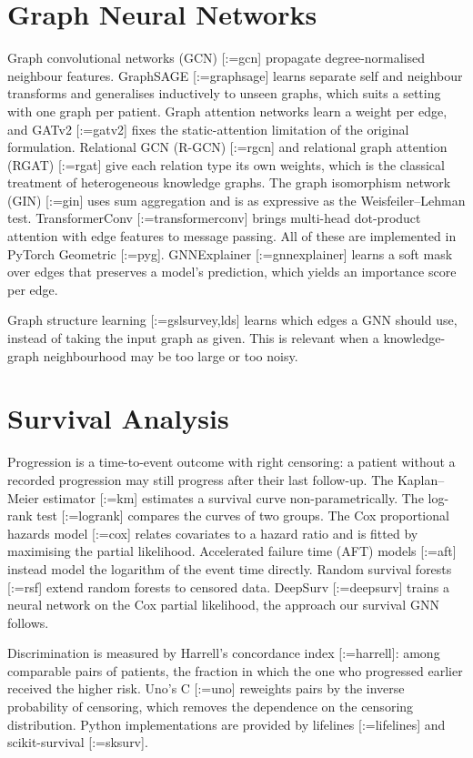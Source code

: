 \documentclass{mnnit}
\makeatletter
\newcommand{\rc}[1]{[\def\rc@sep{}\@for\rc@key:=#1\do{\rc@sep\ref{ref:\rc@key}\def\rc@sep{, }}]}
\makeatother
\begin{document}
\section{Graph Neural Networks}
Graph convolutional networks (GCN) \rc{gcn} propagate degree-normalised neighbour features. GraphSAGE \rc{graphsage}
learns separate self and neighbour transforms and generalises inductively to unseen graphs, which suits a setting
with one graph per patient. Graph attention networks learn a weight per edge, and GATv2 \rc{gatv2} fixes the
static-attention limitation of the original formulation. Relational GCN (R-GCN) \rc{rgcn} and relational graph
attention (RGAT) \rc{rgat} give each relation type its own weights, which is the classical treatment of
heterogeneous knowledge graphs. The graph isomorphism network (GIN) \rc{gin} uses sum aggregation and is as
expressive as the Weisfeiler--Lehman test. TransformerConv \rc{transformerconv} brings multi-head dot-product
attention with edge features to message passing. All of these are implemented in PyTorch Geometric \rc{pyg}.
GNNExplainer \rc{gnnexplainer} learns a soft mask over edges that preserves a model's prediction, which yields an
importance score per edge.

Graph structure learning \rc{gslsurvey,lds} learns which edges a GNN should use, instead of taking the input
graph as given. This is relevant when a knowledge-graph neighbourhood may be too large or too noisy.

\section{Survival Analysis}
Progression is a time-to-event outcome with right censoring: a patient without a recorded progression may still
progress after their last follow-up. The Kaplan--Meier estimator \rc{km} estimates a survival curve non-parametrically.
The log-rank test \rc{logrank} compares the curves of two groups. The Cox proportional hazards model \rc{cox}
relates covariates to a hazard ratio and is fitted by maximising the partial likelihood. Accelerated failure time
(AFT) models \rc{aft} instead model the logarithm of the event time directly. Random survival forests \rc{rsf}
extend random forests to censored data. DeepSurv \rc{deepsurv} trains a neural network on the Cox partial
likelihood, the approach our survival GNN follows.

Discrimination is measured by Harrell's concordance index \rc{harrell}: among comparable pairs of patients, the
fraction in which the one who progressed earlier received the higher risk. Uno's C \rc{uno} reweights pairs by the
inverse probability of censoring, which removes the dependence on the censoring distribution. Python
implementations are provided by lifelines \rc{lifelines} and scikit-survival \rc{sksurv}.
\end{document}
